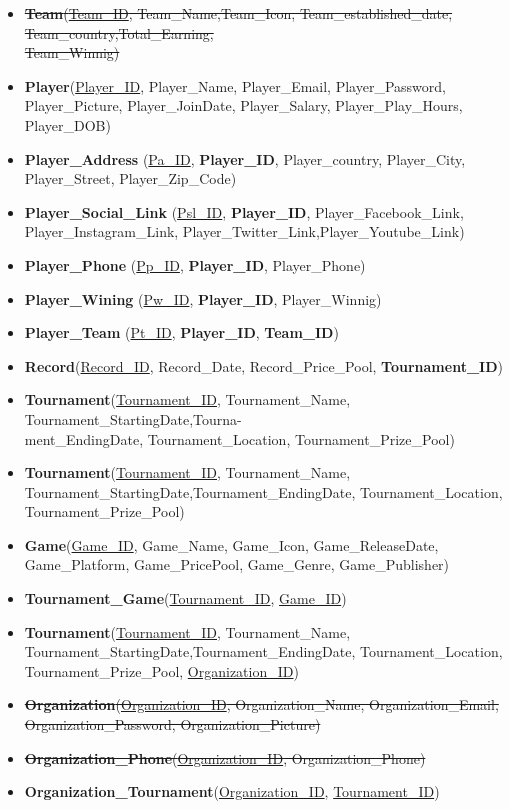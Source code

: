 \begin{itemize}
    \item \sout{\textbf{Team}(\underline{Team\_ID}, Team\_Name,Team\_Icon, Team\_established\_date, Team\_country,Total\_Earning,\\Team\_Winnig)}
    \item \textbf{Player}(\underline{Player\_ID}, Player\_Name, Player\_Email, Player\_Password, Player\_Picture, Player\_JoinDate, Player\_Salary, Player\_Play\_Hours, Player\_DOB)
    \item \textbf{Player\_Address} (\underline{Pa\_ID}, \textbf{Player\_ID}, Player\_country, Player\_City, Player\_Street, Player\_Zip\_Code)
    \item \textbf{Player\_Social\_Link} (\underline{Psl\_ID}, \textbf{Player\_ID}, Player\_Facebook\_Link, Player\_Instagram\_Link, Player\_Twitter\_Link,Player\_Youtube\_Link)
    \item \textbf{Player\_Phone} (\underline{Pp\_ID}, \textbf{Player\_ID}, Player\_Phone)
    \item \textbf{Player\_Wining} (\underline{Pw\_ID}, \textbf{Player\_ID}, Player\_Winnig)
    \item \textbf{Player\_Team} (\underline{Pt\_ID}, \textbf{Player\_ID}, \textbf{Team\_ID})


    \item \textbf{Record}(\underline{Record\_ID}, Record\_Date, Record\_Price\_Pool, \textbf{Tournament\_ID})
    \item \textbf{Tournament}(\underline{Tournament\_ID}, Tournament\_Name, Tournament\_StartingDate,Tourna-\\ment\_EndingDate, Tournament\_Location, Tournament\_Prize\_Pool)


    \item \textbf{Tournament}(\underline{Tournament\_ID}, Tournament\_Name, Tournament\_StartingDate,Tournament\_EndingDate, Tournament\_Location, Tournament\_Prize\_Pool)
    \item \textbf{Game}(\underline{Game\_ID}, Game\_Name, Game\_Icon, Game\_ReleaseDate, Game\_Platform, Game\_PricePool, Game\_Genre, Game\_Publisher)
    \item \textbf{Tournament\_Game}(\underline{Tournament\_ID}, \underline{Game\_ID})


    \item \textbf{Tournament}(\underline{Tournament\_ID}, Tournament\_Name, Tournament\_StartingDate,Tournament\_EndingDate, Tournament\_Location, Tournament\_Prize\_Pool, \underline{Organization\_ID})
    \item \sout{\textbf{Organization}(\underline{Organization\_ID}, Organization\_Name, Organization\_Email, Organization\_Password, Organization\_Picture)}
    \item \sout{\textbf{Organization\_Phone}(\underline{Organization\_ID}, Organization\_Phone)}
    \item \textbf{Organization\_Tournament}(\underline{Organization\_ID}, \underline{Tournament\_ID})



\end{itemize}
